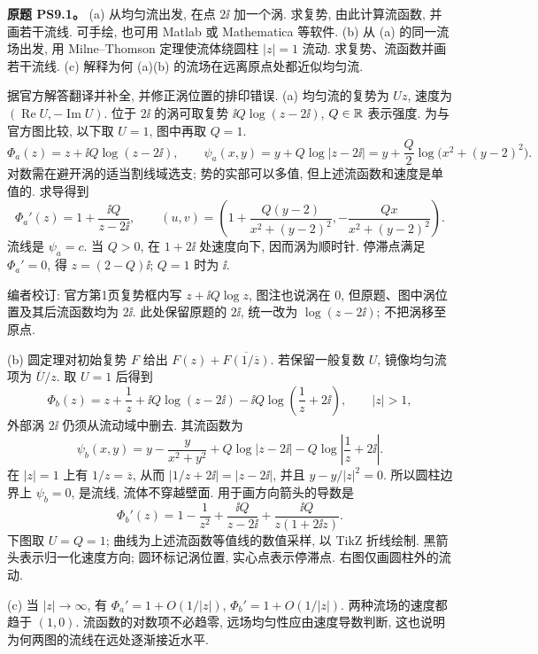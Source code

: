 
\begin{exercise}
\textbf{原题 PS9.1。}\label{ass:ps9-1}
(a) 从均匀流出发, 在点 $2\ii$ 加一个涡. 求复势, 由此计算流函数, 并画若干流线. 可手绘, 也可用 Matlab 或 Mathematica 等软件.
(b) 从 (a) 的同一流场出发, 用 Milne--Thomson 定理使流体绕圆柱 $|z|=1$ 流动. 求复势、流函数并画若干流线.
(c) 解释为何 (a)(b) 的流场在远离原点处都近似均匀流.
\end{exercise}
\begin{solution}
据官方解答翻译并补全, 并修正涡位置的排印错误.
(a) 均匀流的复势为 $Uz$, 速度为 $(\operatorname{Re}U,-\operatorname{Im}U)$. 位于 $2\ii$ 的涡可取复势 $\ii Q\log(z-2\ii)$, $Q\in\mathbb R$ 表示强度. 为与官方图比较, 以下取 $U=1$, 图中再取 $Q=1$.
\[
 \Phi_a(z)=z+\ii Q\log(z-2\ii),\qquad
 \psi_a(x,y)=y+Q\log|z-2\ii|
 =y+\frac Q2\log\bigl(x^2+(y-2)^2\bigr).
\]
对数需在避开涡的适当割线域选支; 势的实部可以多值, 但上述流函数和速度是单值的. 求导得到
\[
 \Phi_a'(z)=1+\frac{\ii Q}{z-2\ii},\qquad
 (u,v)=\left(1+\frac{Q(y-2)}{x^2+(y-2)^2},
 -\frac{Qx}{x^2+(y-2)^2}\right).
\]
流线是 $\psi_a=c$. 当 $Q>0$, 在 $1+2\ii$ 处速度向下, 因而涡为顺时针. 停滞点满足 $\Phi_a'=0$, 得 $z=(2-Q)\ii$; $Q=1$ 时为 $\ii$.

编者校订: 官方第1页复势框内写 $z+\ii Q\log z$, 图注也说涡在 $0$, 但原题、图中涡位置及其后流函数均为 $2\ii$. 此处保留原题的 $2\ii$, 统一改为 $\log(z-2\ii)$; 不把涡移至原点.

(b) 圆定理对初始复势 $F$ 给出 $F(z)+\overline{F(1/\overline z)}$. 若保留一般复数 $U$, 镜像均匀流项为 $\overline U/z$. 取 $U=1$ 后得到
\[
 \Phi_b(z)=z+\frac1z+\ii Q\log(z-2\ii)
 -\ii Q\log\left(\frac1z+2\ii\right),\qquad |z|>1,
\]
外部涡 $2\ii$ 仍须从流动域中删去. 其流函数为
\[
 \psi_b(x,y)=y-\frac{y}{x^2+y^2}
 +Q\log|z-2\ii|-Q\log\left|\frac1z+2\ii\right|.
\]
在 $|z|=1$ 上有 $1/z=\overline z$, 从而 $|1/z+2\ii|=|z-2\ii|$, 并且 $y-y/|z|^2=0$. 所以圆柱边界上 $\psi_b=0$, 是流线, 流体不穿越壁面. 用于画方向箭头的导数是
\[
 \Phi_b'(z)=1-\frac1{z^2}+\frac{\ii Q}{z-2\ii}
 +\frac{\ii Q}{z(1+2\ii z)}.
\]
下图取 $U=Q=1$; 曲线为上述流函数等值线的数值采样, 以 TikZ 折线绘制. 黑箭头表示归一化速度方向; 圆环标记涡位置, 实心点表示停滞点. 右图仅画圆柱外的流动.

(c) 当 $|z|\to\infty$, 有 $\Phi_a'=1+O(1/|z|)$, $\Phi_b'=1+O(1/|z|)$. 两种流场的速度都趋于 $(1,0)$. 流函数的对数项不必趋零, 远场均匀性应由速度导数判断, 这也说明为何两图的流线在远处逐渐接近水平.
\end{solution}

